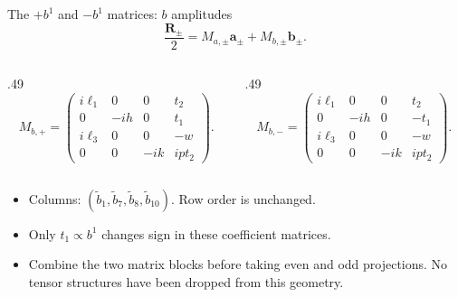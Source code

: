 \begin{frame}{The $+b^1$ and $-b^1$ matrices: $b$ amplitudes}
  \[
    \frac{\boldsymbol R_\pm}{2}
       =M_{a,\pm}\boldsymbol a_\pm+M_{b,\pm}\boldsymbol b_\pm.
  \]
  \begin{columns}[c]
    \begin{column}{.49\textwidth}
      \[M_{b,+}=\begin{pmatrix}
       i\ell_1&0&0&t_2\\
       0&-ih&0&t_1\\
       i\ell_3&0&0&-w\\
       0&0&-ik&ip t_2
      \end{pmatrix}.\]
    \end{column}
    \begin{column}{.49\textwidth}
      \[M_{b,-}=\begin{pmatrix}
       i\ell_1&0&0&t_2\\
       0&-ih&0&-t_1\\
       i\ell_3&0&0&-w\\
       0&0&-ik&ip t_2
      \end{pmatrix}.\]
    \end{column}
  \end{columns}
  \begin{itemize}
    \item Columns: $(\tilde b_1,\tilde b_7,\tilde b_8,\tilde b_{10})$. Row order is unchanged.
    \item Only $t_1\propto b^1$ changes sign in these coefficient matrices.
    \item Combine the two matrix blocks before taking even and odd projections. No tensor structures have been dropped from this geometry.
  \end{itemize}
\end{frame}

